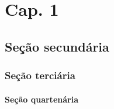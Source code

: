 \chapter{Cap. 1}

\lipsum[3]

\section{Seção secundária}

\lipsum[1]

\subsection{Seção terciária}

\lipsum[1]

\subsubsection{Seção quartenária}

\lipsum[1]


\lipsum[1]

